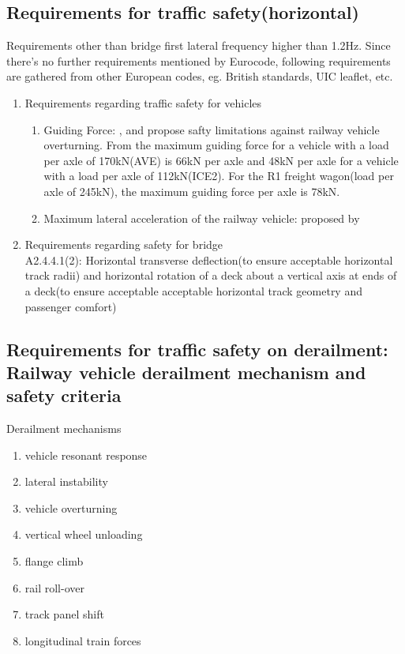 \subsection{Requirements for traffic safety(horizontal)}
Requirements other than bridge first lateral frequency higher than 1.2Hz. Since there's no further requirements mentioned by Eurocode, following requirements are gathered from other European codes, eg. British standards, UIC leaflet, etc.

\begin{enumerate}[-]
    \item Requirements regarding traffic safety for vehicles
    \begin{enumerate}
        \item Guiding Force: \citet{code2005518} , \citet{en200714363} and\citet{cuadrado2008analysis} propose safty limitations against railway vehicle overturning. From\citet{en200714363} the maximum guiding force for a vehicle with a load per axle of 170kN(AVE) is 66kN per axle and 48kN per axle for a vehicle with a load per axle of 112kN(ICE2). For the R1 freight wagon(load per axle of 245kN), the maximum guiding force per axle is 78kN.
        \item Maximum lateral acceleration of the railway vehicle: proposed by \citet{13803}
    \end{enumerate}
    \item Requirements regarding safety for bridge\\
    \citet{EC0} A2.4.4.1(2): Horizontal transverse deflection(to ensure acceptable horizontal track radii) and horizontal rotation of a deck about a vertical axis at ends of a deck(to ensure acceptable acceptable horizontal track geometry and passenger comfort)
\end{enumerate}


\subsection{Requirements for traffic safety on derailment: Railway vehicle derailment mechanism and safety criteria}

Derailment mechanisms
\begin{enumerate}
    \item vehicle resonant response
    \item lateral instability
    \item vehicle overturning
    \item vertical wheel unloading
    \item flange climb
    \item rail roll-over
    \item track panel shift
    \item longitudinal train forces
\end{enumerate}

